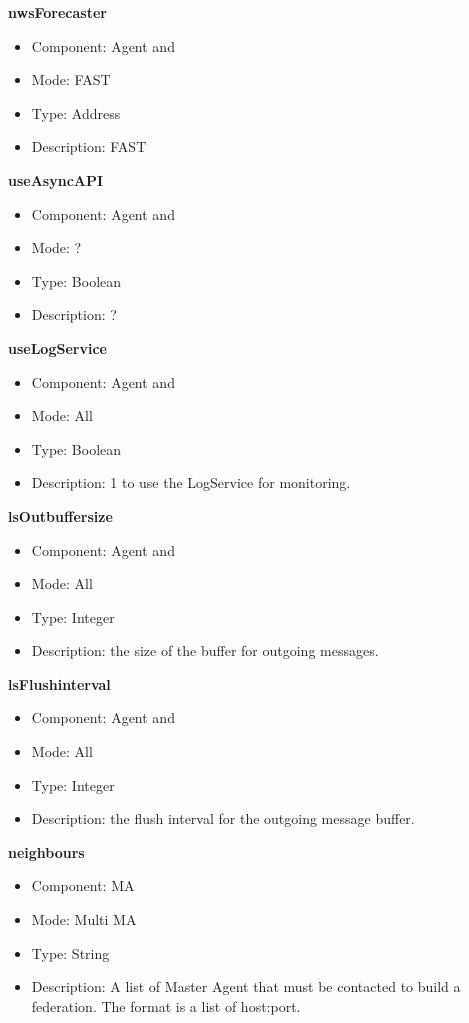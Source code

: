 \begin{description}
\item{\bf{nwsForecaster}}
  \begin{itemize}
  \item Component: Agent and \sed
  \item Mode: FAST
  \item Type: Address
  \item Description: FAST
  \end{itemize}

\item{\bf{useAsyncAPI}}
  \begin{itemize}
  \item Component: Agent and \sed
  \item Mode: ?
  \item Type: Boolean
  \item Description: ?
  \end{itemize}

\item{\bf{useLogService}}
  \begin{itemize}
  \item Component: Agent and \sed
  \item Mode: All
  \item Type: Boolean
  \item Description: 1 to use the LogService for monitoring.
  \end{itemize}

\item{\bf{lsOutbuffersize}}
  \begin{itemize}
  \item Component: Agent and \sed
  \item Mode: All
  \item Type: Integer
  \item Description: the size of the buffer for outgoing messages.
  \end{itemize}

\item{\bf{lsFlushinterval}}
  \begin{itemize}
  \item Component: Agent and \sed
  \item Mode: All
  \item Type: Integer
  \item Description: the flush interval for the outgoing message buffer.
  \end{itemize}

\item{\bf{neighbours}}
  \begin{itemize}
  \item Component: MA
  \item Mode: Multi MA
  \item Type: String
  \item Description: A list of Master Agent that must be contacted to
    build a federation. The format is a list of host:port.
  \end{itemize}


\end{description}
